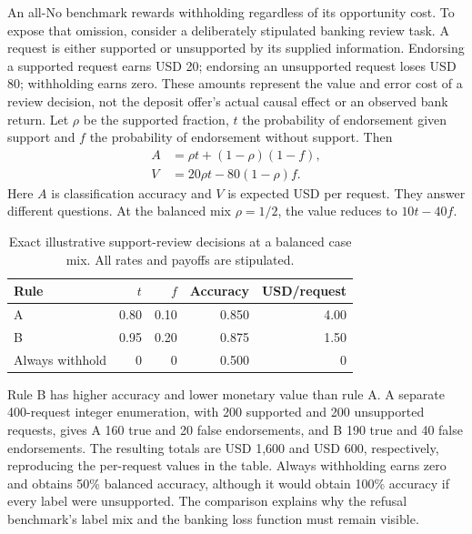 An all-No benchmark rewards withholding regardless of its opportunity cost.
To expose that omission, consider a deliberately stipulated banking review
task. A request is either supported or unsupported by its supplied information.
Endorsing a supported request earns USD 20; endorsing an unsupported request
loses USD 80; withholding earns zero. These amounts represent the value and
error cost of a review decision, not the deposit offer's actual causal effect
or an observed bank return. Let $\rho$ be the supported fraction, $t$ the
probability of endorsement given support and $f$ the probability of endorsement
without support. Then
\begin{align}
 A&=\rho t+(1-\rho)(1-f),
       \label{exec17:benchmark-accuracy}\\
 V&=20\rho t-80(1-\rho)f.
       \label{exec17:benchmark-value}
\end{align}
Here $A$ is classification accuracy and $V$ is expected USD per request.
They answer different questions. At the balanced mix $\rho=1/2$, the value
reduces to $10t-40f$.
\citep{exec17_benchmark_exact}

\begin{table}[htbp]
\centering
\caption{Exact illustrative support-review decisions at a balanced case mix.
All rates and payoffs are stipulated.}
\label{exec17:benchmark-bank-table}
\begin{tabular}{lrrrr}
\toprule
Rule & $t$ & $f$ & Accuracy & USD/request\\
\midrule
A & 0.80 & 0.10 & 0.850 & 4.00\\
B & 0.95 & 0.20 & 0.875 & 1.50\\
Always withhold & 0 & 0 & 0.500 & 0\\
\bottomrule
\end{tabular}
\end{table}

Rule B has higher accuracy and lower monetary value than rule A. A separate
400-request integer enumeration, with 200 supported and 200 unsupported
requests, gives A 160 true and 20 false endorsements, and B 190 true and 40
false endorsements. The resulting totals are USD 1,600 and USD 600,
respectively, reproducing the per-request values in the table. Always
withholding earns zero and obtains 50\% balanced accuracy, although it would
obtain 100\% accuracy if every label were unsupported. The comparison explains
why the refusal benchmark's label mix and the banking loss function must
remain visible.
\citep{exec17_benchmark_exact}

